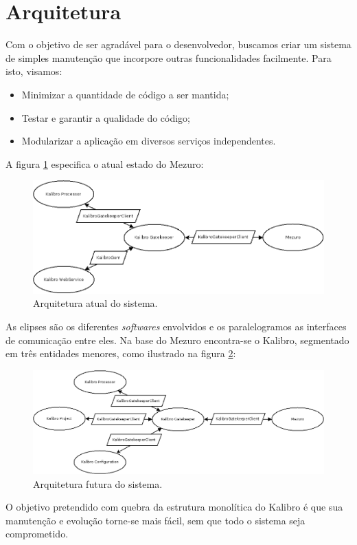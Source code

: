\documentclass{llncs}
\begin{document}
\section{Arquitetura}
Com o objetivo de ser agradável para o desenvolvedor, buscamos criar um sistema de simples manutenção que incorpore outras funcionalidades facilmente. Para isto, visamos:
\begin{itemize}
  \item Minimizar a quantidade de código a ser mantida;
  \item Testar e garantir a qualidade do código;
  \item Modularizar a aplicação em diversos serviços independentes.
\end{itemize}

A figura \ref{fig:architecture-1} especifica o atual estado do Mezuro:
\begin{figure}[H]
  \centering
  \includegraphics[width=\textwidth]{images/mezuro-architecture-actual.png}
  \caption{Arquitetura atual do sistema.}
  \label{fig:architecture-1}
\end{figure}
As elipses são os diferentes \textit{softwares} envolvidos e os paralelogramos as interfaces de comunicação entre eles. Na base do Mezuro encontra-se o Kalibro, segmentado em três entidades menores, como ilustrado na figura \ref{fig:architecture-2}:
\begin{figure}[H]
  \centering
    \includegraphics[width=\textwidth]{images/mezuro-architecture-predicted.png}
  \caption{Arquitetura futura do sistema.}
  \label{fig:architecture-2}
\end{figure}
O objetivo pretendido com quebra da estrutura monolítica do Kalibro é que sua manutenção e evolução torne-se mais fácil, sem que todo o sistema seja comprometido.
\end{document}
